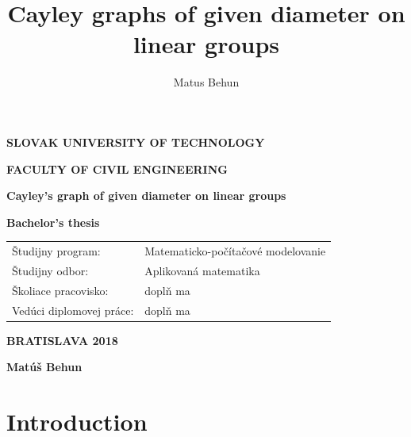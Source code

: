 \documentclass[a4paper,11pt,twoside]{report}%
\author{Matus Behun}
\title{Cayley graphs of given diameter on linear groups}
\begin{document}
\setlength{\belowdisplayskip}{7pt} \setlength{\belowdisplayshortskip}{5pt}
\setlength{\abovedisplayskip}{7pt} \setlength{\abovedisplayshortskip}{5pt}

\thispagestyle{empty}
{
	\topmargin=0pt
	\centerline {\large \bf{SLOVAK UNIVERSITY OF TECHNOLOGY}}
	\vskip 0.2cm
	\centerline{\large \bf{FACULTY OF CIVIL ENGINEERING}}
	\vskip 5cm
	\centerline{\Large \bf{Cayley's graph of given diameter on linear groups}}
	\vskip 0.2cm
	\vskip 0.5cm
	\centerline{\large \bf{Bachelor's thesis}}
	\vskip 5cm          %
	\normalsize
		\begin{tabular}[l]{p{}p{}}
		Študijny program: & Matematicko-počítačové modelovanie\\
		Študijny odbor: & Aplikovaná matematika\\
		Školiace pracovisko: & doplň ma\\
		Vedúci diplomovej práce: & doplň ma \\
		\end{tabular}
	\vskip 3cm
	\centerline{\large \bf{BRATISLAVA 2018}}
	\vskip 0.2cm
	\centerline{\large \bf{Matúš Behun}}
}

\pagebreak
\tableofcontents
\newpage

\section{Introduction}


\end{document}
